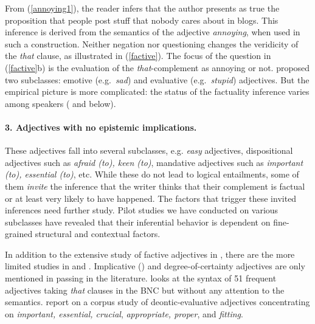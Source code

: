\documentclass[10pt]{article}
\begin{document}
 \vspace{-.1in}
 \vspace{-.1in}
From (\ref{annoying1}), the reader infers that the author presents as true the proposition that people post stuff that nobody cares about in blogs.
This inference is derived from the semantics of the adjective {\it annoying}, when used in such a construction. 
Neither negation nor questioning changes the veridicity of the \emph{that }clause, as illustrated in (\ref{factive}).  The focus of the question in (\ref{factive}b) is the evaluation of the \textit{that}-complement as annoying or not.
 \vspace{-.1in}
 \vspace{-.1in}
\cite{norrick:1978} proposed two subclasses: emotive (e.g.\ \textit{sad}) and evaluative (e.g.\ \textit{stupid}) adjectives. But the empirical picture is more complicated: the status of the factuality inference varies among speakers (\cite{csli-gang-cssp13} and below).

\vspace{-.2in}
\paragraph{3. Adjectives with no epistemic implications.}
These adjectives fall into several subclasses, e.g. \textit{easy} adjectives, dispositional adjectives such as \textit{afraid (to), keen (to)}, mandative adjectives such as \textit{important (to), essential (to)}, etc. While these do not lead to logical entailments, some of them \textit{invite} the inference that the writer thinks that their complement is factual or at least very likely to have happened. The factors that trigger these invited inferences need further study. Pilot studies we have conducted on various subclasses have revealed  that their inferential behavior is dependent on fine-grained structural and contextual factors.

In addition to the extensive study of factive adjectives in \cite{norrick:1978},
there are the more limited studies in \cite{wilkinson:1970} and \cite{barker:2002}. Implicative (\cite{karttunen:1971}) and degree-of-certainty adjectives are only mentioned in passing in the literature. \cite{mindt:2011} looks at the syntax of 51 frequent adjectives taking \emph{that }clauses in the BNC but without any attention to the semantics. \cite{vanlinden+davidse:2009} report on a corpus study of deontic-evaluative adjectives concentrating on \emph{important, essential, crucial}, \emph{appropriate, proper}, and \emph{fitting}.
 
\end{document}
